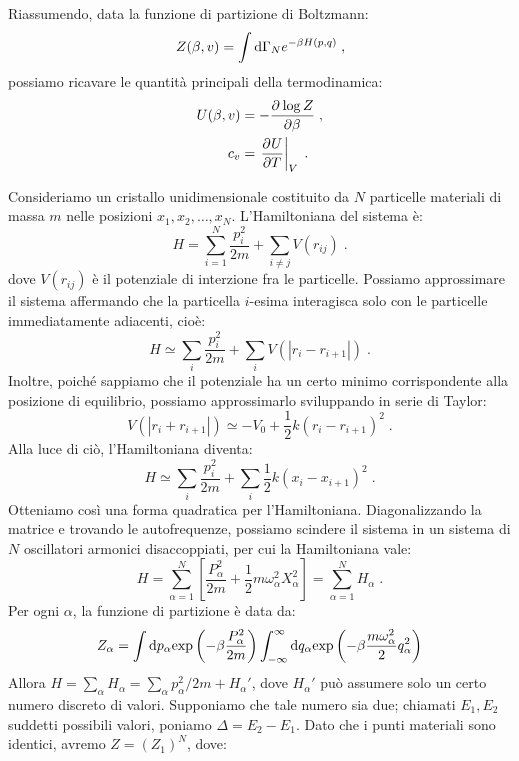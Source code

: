 Riassumendo, data la funzione di partizione di Boltzmann:
\begin{equation}
Z(\beta,v)=\int \diff[\Gamma]_N e^{-\beta H(p,q)}\;,
\end{equation}
possiamo ricavare le quantità principali della termodinamica:
\begin{align}
U(\beta, v) &= -\pdev{\log Z}{\beta}\;, \\
c_v &= \left.\pdev{U}{T}\right|_V\;.
\end{align}
\begin{exm}
Consideriamo un cristallo unidimensionale costituito da $N$ particelle materiali di massa $m$ nelle posizioni $x_1,x_2,\ldots,x_N$. L'Hamiltoniana del sistema è:
$$
H=\sum_{i=1}^N \frac{p_i^2}{2m}+\sum_{i\ne j} V(r_{ij})\;.
$$
dove $V(r_{ij})$ è il potenziale di interzione fra le particelle. Possiamo approssimare il sistema affermando che la particella $i$-esima interagisca solo con le particelle immediatamente adiacenti, cioè:
\begin{equation}
H\simeq \sum_{i} \frac{p_i^2}{2m}+\sum_i V(|r_i-r_{i+1}|)\;.
\end{equation}
Inoltre, poiché sappiamo che il potenziale ha un certo minimo corrispondente alla posizione di equilibrio, possiamo approssimarlo sviluppando in serie di Taylor:
\begin{equation}
V(|r_i+r_{i+1}|)\simeq -V_0+\frac{1}{2}k(r_i-r_{i+1})^2\;.
\end{equation}
Alla luce di ciò, l'Hamiltoniana diventa:
\begin{equation}
H \simeq \sum_i \frac{p_i^2}{2m}+\sum_i \frac{1}{2}k(x_i-x_{i+1})^2\;.
\end{equation}
Otteniamo così una forma quadratica per l'Hamiltoniana. Diagonalizzando la matrice e trovando le autofrequenze, possiamo scindere il sistema in un sistema di $N$ oscillatori armonici disaccoppiati, per cui la Hamiltoniana vale:
\begin{equation}
H = \sum_{\alpha=1}^N \left[\frac{P_{\alpha}^2}{2m}+\frac{1}{2}m\omega_{\alpha}^2 X_{\alpha}^2\right]=\sum_{\alpha=1}^N H_{\alpha}\;.
\end{equation}
Per ogni $\alpha$, la funzione di partizione è data da:
\begin{equation}
Z_{\alpha}=\int\diff[p]_{\alpha} \mathrm{exp}\left(-\beta\frac{P_{\alpha}^2}{2m}\right)\int_{-\infty}^{\infty} \diff[q]_{\alpha} \mathrm{exp}\left(-\beta\frac{m\omega_{\alpha}^2}{2}q_{\alpha}^2\right)
\end{equation}
Allora $H=\sum_{\alpha} H_{\alpha}=\sum_{\alpha}p_{\alpha}^2/2m+H_{\alpha}'$, dove $H_{\alpha}'$ può assumere solo un certo numero discreto di valori. Supponiamo che tale numero sia due; chiamati $E_1,E_2$ suddetti possibili valori, poniamo $\Delta=E_2-E_1$. Dato che i punti materiali sono identici, avremo $Z=(Z_1)^N$, dove:

\end{exm}
